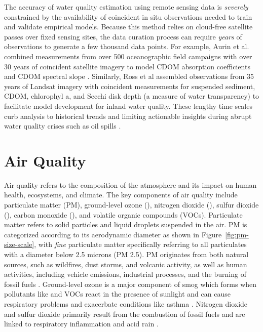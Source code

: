 The accuracy of water quality estimation using remote sensing data is
\textit{severely} constrained by the availability of coincident in situ
observations needed to train and validate empirical models. Because this method
relies on cloud-free satellite passes over fixed sensing sites, the data
curation process can require \textit{years} of observations to generate a few
thousand data points. For example, Aurin et al. combined measurements from
over 500 oceanographic field campaigns with over 30 years of coincident
satellite imagery to model CDOM absorption coefficients and CDOM
spectral slope \cite{aurin2018remote}. Similarly, Ross et al assembled
observations from 35 years of Landsat imagery with coincident measurements for
suspended sediment, CDOM, chlorophyl a, and Secchi disk depth (a measure of
water transparency) to facilitate model development for inland water quality.
These lengthy time scales curb analysis to historical trends and limiting
actionable insights during abrupt water quality crises such as oil spills
\cite{fingas2017review}.



\section{Air Quality}

Air quality refers to the composition of the atmosphere and its impact on human
health, ecosystems, and climate. The key components of air quality include
particulate matter (PM), ground-level ozone (), nitrogen dioxide (), sulfur
dioxide (), carbon monoxide (), and volatile organic compounds (VOCs).
Particulate matter refers to solid particles and liquid droplets suspended in
the air. PM is categorized according to its aerodynamic diameter as shown in
Figure~\ref{fig:pm-size-scale}, with \textit{fine} particulate matter
specifically referring to all particulates with a diameter below 2.5 microns (PM
2.5). PM originates from both natural sources, such as wildfires, dust storms, and
volcanic activity, as well as human activities, including vehicle emissions,
industrial processes, and the burning of fossil fuels \cite{pm-sources-1,
  air-chem-and-physics}. Ground-level ozone is a major component of smog
which forms when pollutants like  and VOCs react in the presence of
sunlight and can cause respiratory problems and exacerbate conditions like
asthma \cite{ozone-health}. Nitrogen dioxide and sulfur dioxide primarily result
from the combustion of fossil fuels and are linked to respiratory inflammation
and acid rain \cite{no2-health, aq-and-health}.

